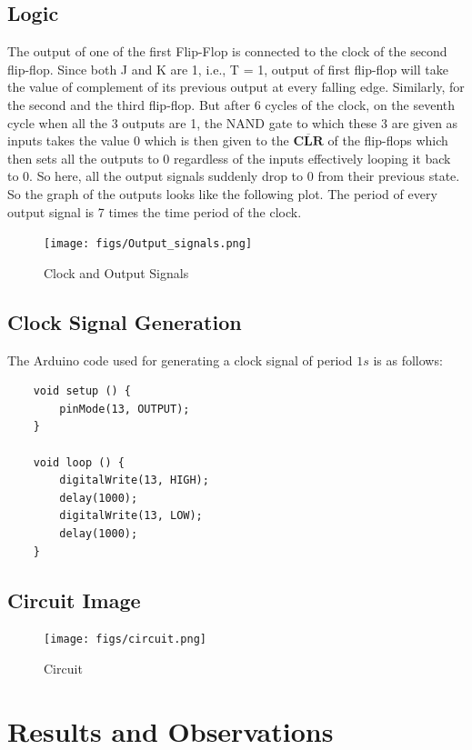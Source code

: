 \documentclass{article}
\begin{document}
\subsection{Logic}
The output of one of the first Flip-Flop is connected to the clock of the second flip-flop. Since both J and K are 1, i.e., T = 1, output of first flip-flop will take the value of complement of its previous output at every falling edge. Similarly, for the second and the third flip-flop. But after 6 cycles of the clock, on the seventh cycle when all the 3 outputs are 1, the NAND gate to which these 3 are given as inputs takes the value 0 which is then given to the $\mathbf{\overline{CLR}}$ of the flip-flops which then sets all the outputs to 0 regardless of the inputs effectively looping it back to 0. So here, all the output signals suddenly drop to 0 from their previous state. So the graph of the outputs looks like the following plot. The period of every output signal is 7 times the time period of the clock.

\begin{figure}[h!]
    \centering
    \texttt{[image: figs/Output\_signals.png]}
    \caption{Clock and Output Signals}
    \label{fig:enter-label}
\end{figure}

\subsection{Clock Signal Generation}
The Arduino code used for generating a clock signal of period $1s$ is as follows:
\begin{verbatim}
    void setup () {
        pinMode(13, OUTPUT);
    }

    void loop () {
        digitalWrite(13, HIGH);
        delay(1000);
        digitalWrite(13, LOW);
        delay(1000);
    }
\end{verbatim}
\pagebreak
\subsection{Circuit Image}
\begin{figure}[h!]
    \centering
    \texttt{[image: figs/circuit.png]}
    \caption{Circuit}
    \label{fig:enter-label}
\end{figure}

\section{Results and Observations}
\end{document}
